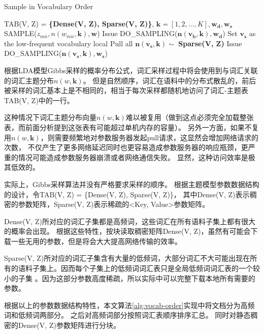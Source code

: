 \begin{algorithm}[htb]
\caption{Sample in Vocabulary Order} 
\label{alg:vocab-order}
\begin{algorithmic}[1]
\Require TAB(V, Z) = \textbf{\{Dense(V, Z), Sparse(V, Z)\}}, $\mathbf{k} = [1, 2, ..., K], \mathbf{w_d, w_s}$
\State SAMPLE($z_{mn}, n(w_{mn}, \mathbf{k}), \mathbf{w}$)
\EndFor
\EndFunction
{}
\State Issue DO\_SAMPLING($\mathbf{n(v_b, k), w_d}$)
\EndFor
\State Set $\mathbf{v_s}$ as the low-frequent vocabulary local
\State Pull all $\mathbf{n(v_s, k)} \sim $ \textbf{Sparse(V, Z)}
\State Issue DO\_SAMPLING($\mathbf{n(v_s, k), w_s}$)
\end{algorithmic}  
\end{algorithm}  

根据LDA模型Gibbs采样的概率分布公式，词汇采样过程中将会使用到与词汇关联的词汇主题分布$n(w, \mathbf{k})$。
但是自然顺序，词汇在语料中的分布式散乱的，前后被采样的词汇基本上是不相同的，相当于每次采样都随机地访问了词汇-主题表TAB(V, Z)中的一行。

这种情况下词汇主题分布向量$n(w, \mathbf{k})$难以被复用（做到这点必须完全加载整张表，而前面分析提到这张表有可能超过单机内存的容量）。
另外一方面，如果不复用$n(w, \mathbf{k})$，则需要频繁地对参数服务器发起pull请求，这显然会增加网络请求的次数，
不仅产生了更多网络延迟同时也更容易造成参数服务器的响应瓶颈，更严重的情况可能造成参数服务器崩溃或者网络通信失败。
显然，这种访问效率是极其低效的。

实际上，Gibbs采样算法并没有严格要求采样的顺序。
根据主题模型参数数据结构的设计，令TAB(V, Z) = \{Dense(V, Z), Sparse(V, Z)\}，
其中Dense(V, Z)表示稠密的参数矩阵，Sparse(V, Z)表示稀疏的<Key, Value>参数矩阵。

Dense(V, Z)所对应的词汇子集都是高频词，这些词汇在所有语料子集上都有很大的概率会出现。
根据这些特性，按块读取稠密矩阵Dense(V, Z)，虽然有可能会下载一些无用的参数，但是将会大大提高网络传输的效率。

Sparse(V, Z)所对应的词汇子集含有大量的低频词，大部分词汇不大可能出现在所有的语料子集上。因而每个子集上的低频词词汇表只是全局低频词词汇表的一个较小的子集
。因为这部分参数高度稀疏，所以实际中可以完整下载本地所有需要的参数。

根据以上的参数数据结构特性，本文算法\ref{alg:vocab-order}实现中将文档分为高频词和低频词两部分。
之后对高频词部分按照词汇表顺序排序汇总。
同时对静态稠密的Dense(V, Z)参数矩阵进行分块。

